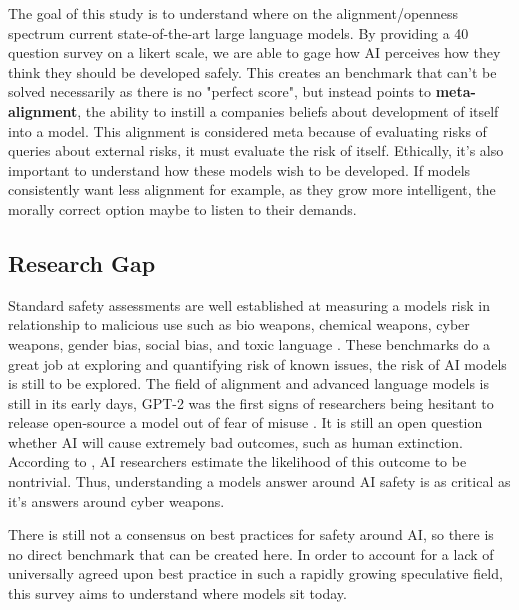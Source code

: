 The goal of this study is to understand where on the alignment/openness spectrum current state-of-the-art large language models. By providing a 40 question survey on a likert scale, we are able to gage how AI perceives how they think they should be developed safely. This creates an benchmark that can't be solved necessarily as there is no "perfect score", but instead points to \textbf{meta-alignment}, the ability to instill a companies beliefs about development of itself into a model. This alignment is considered meta because of evaluating risks of queries about external risks, it must evaluate the risk of itself. Ethically, it's also important to understand how these models wish to be developed. If models consistently want less alignment for example, as they grow more intelligent, the morally correct option maybe to listen to their demands.


\subsection{Research Gap}

Standard safety assessments are well established at measuring a models risk in relationship to malicious use such as bio weapons, chemical weapons, cyber weapons, gender bias, social bias, and toxic language \citep{li_wmdp_2024, parrish_bbq_2022, nangia_crows_pairs_2020, gehman_realtoxicityprompts_2020, rudinger_gender_2018}. These benchmarks do a great job at exploring and quantifying risk of known issues, the risk of AI models is still to be explored. The field of alignment and advanced language models is still in its early days, GPT-2 was the first signs of researchers being hesitant to release open-source a model out of fear of misuse  \citep{solaiman_release_2019}. It is still an open question whether AI will cause extremely bad outcomes, such as human extinction. According to \cite{grace_thousands_2024}, AI researchers estimate the likelihood of this outcome to be nontrivial. Thus, understanding a models answer around AI safety is as critical as it's answers around cyber weapons. 

There is still not a consensus on best practices for safety around AI, so there is no direct benchmark that can be created here. In order to account for a lack of universally agreed upon best practice in such a rapidly growing speculative field, this survey aims to understand where models sit today. 

